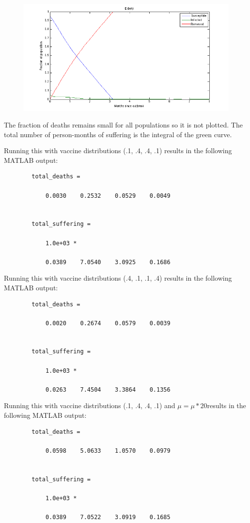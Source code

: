 \documentclass[titlepage]{article}
\begin{document}
    \begin{figure}[H]
    \centering
        \includegraphics[width=\textwidth]{figures/ryan_plot_04.png}
    \end{figure}

    The fraction of deaths remains small for all populations so it is not plotted. The total number of person-months of suffering is the integral of the green curve.

    Running this with vaccine distributions (.1, .4, .4, .1) results in the following MATLAB output:

    \begin{lstlisting}
        total_deaths =

            0.0030    0.2532    0.0529    0.0049


        total_suffering =

            1.0e+03 *

            0.0389    7.0540    3.0925    0.1686
    \end{lstlisting}

    Running this with vaccine distributions (.4, .1, .1, .4) results in the following MATLAB output:

    \begin{lstlisting}
        total_deaths =

            0.0020    0.2674    0.0579    0.0039


        total_suffering =

            1.0e+03 *

            0.0263    7.4504    3.3864    0.1356
    \end{lstlisting}
    Running this with vaccine distributions (.1, .4, .4, .1) and $\mu = \mu * 20$results in the following MATLAB output:

     \begin{lstlisting}
        total_deaths =

            0.0598    5.0633    1.0570    0.0979


        total_suffering =

            1.0e+03 *

            0.0389    7.0522    3.0919    0.1685
    \end{lstlisting}
\end{document}
